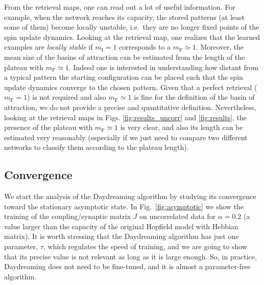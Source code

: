 \documentclass[a4paper]{cas-sc}
\begin{document}
From the retrieval maps, one can read out a lot of useful information.
For example, when the network reaches its capacity, the stored patterns (at least some of them) become locally unstable, i.e.\ they are no longer fixed points of the spin update dynamics.
Looking at the retrieval map, one realizes that the learned examples are \emph{locally stable} if $m_\mathrm{I}=1$ corresponds to a $m_\mathrm{F}\simeq1$.
Moreover, the mean size of the basins of attraction can be estimated from the length of the plateau with $m_\mathrm{F}\simeq1$.
Indeed one is interested in understanding how distant from a typical pattern the starting configuration can be placed such that the spin update dynamics converge to the chosen pattern. 
Given that a perfect retrieval ($m_\text{F}=1$) is not required and also $m_\text{F}\simeq1$ is fine for the definition of the basin of attraction, we do not provide a precise and quantitative definition.
Nevertheless, looking at the retrieval maps in Figs. \ref{fig:results_uncorr} and \ref{fig:results}, the presence of the plateau with $m_\mathrm{F}\simeq1$ is very clear, and also its length can be estimated very reasonably (especially if we just need to compare two different networks to classify them according to the plateau length).

\subsection{Convergence}
We start the analysis of the Daydreaming algorithm by studying its convergence toward the stationary asymptotic state. In Fig.~\ref{fig:asymptotic} we show the training of the coupling/synaptic matrix $J$ on uncorrelated data for $\alpha=0.2$ (a value larger than the capacity of the original Hopfield model with Hebbian matrix). It is worth stressing that the Daydreaming algorithm has just one parameter, $\tau$, which regulates the speed of training, and we are going to show that its precise value is not relevant as long as it is large enough.
So, in practice, Daydreaming does not need to be fine-tuned, and it is almost a parameter-free algorithm.
\end{document}

